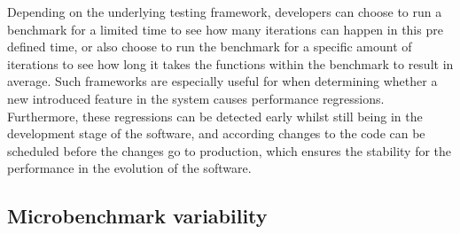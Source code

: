\documentclass{seal_thesis}
\begin{document}
\noindent Depending on the underlying testing framework, developers can choose to run a benchmark for a limited time to see how many iterations can happen in this pre defined time, or also choose to run the benchmark for a specific amount of iterations to see how long it takes the functions within the benchmark to result in average. Such frameworks are especially useful for when determining whether a new introduced feature in the system causes performance regressions. Furthermore, these regressions can be detected early whilst still being in the development stage of the software, and according changes to the code can be scheduled before the changes go to production, which ensures the stability for the performance in the evolution of the software.


\subsection{Microbenchmark variability}
\label{Microbenchmark variability}
\end{document}
